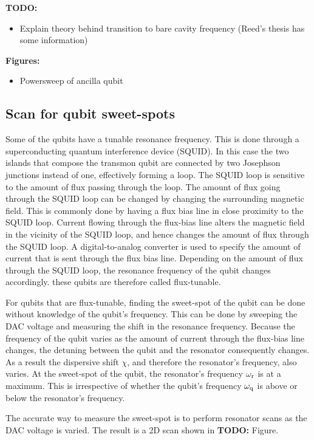         \textbf{TODO:}
        \begin{itemize}
          \item Explain theory behind transition to bare cavity frequency (Reed's thesis has some information)
        \end{itemize}

        \textbf{Figures:}
        \begin{itemize}
          \item Powersweep of ancilla qubit
        \end{itemize}

      \subsection{Scan for qubit sweet-spots}
        Some of the qubits have a tunable resonance frequency. This is done through a superconducting quantum interference device (SQUID). In this case the two islands that compose the transmon qubit are connected by two Josephson junctions instead of one, effectively forming a loop. The SQUID loop is sensitive to the amount of flux passing through the loop. The amount of flux going through the SQUID loop can be changed by changing the surrounding magnetic field. This is commonly done by having a flux bias line in close proximity to the SQUID loop. Current flowing through the flux-bias line alters the magnetic field in the vicinity of the SQUID loop, and hence changes the amount of flux through the SQUID loop. A digital-to-analog converter is used to specify the amount of current that is sent through the flux bias line. Depending on the amount of flux through the SQUID loop, the resonance frequency of the qubit changes accordingly. these qubits are therefore called flux-tunable.

        For qubits that are flux-tunable, finding the sweet-spot of the qubit can be done without knowledge of the qubit's frequency. This can be done by sweeping the DAC voltage and measuring the shift in the resonance frequency. Because the frequency of the qubit varies as the amount of current through the flux-bias line changes, the detuning between the qubit and the resonator consequently changes. As a result the dispersive shift $\chi$, and therefore the resonator's frequency, also varies. At the sweet-spot of the qubit, the resonator's frequency $\omega_\text{r}$ is at a maximum. This is irrespective of whether the qubit's frequency $\omega_\text{q}$ is above or below the resonator's frequency.

        The accurate way to measure the sweet-spot is to perform resonator scans as the DAC voltage is varied. The result is a 2D scan shown in \textbf{TODO:} Figure.

